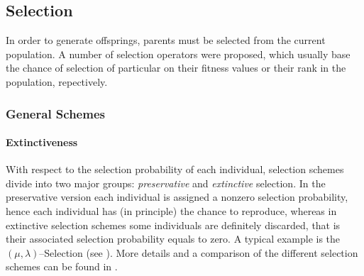 %
%

        \subsection{Selection}

In order to generate offsprings, parents must be selected from the
current population.
A number of selection operators were proposed, which usually base the
chance of selection of particular on their fitness values or their
rank in the population, repectively.

        \subsubsection{General Schemes}





        \paragraph{Extinctiveness}

With respect to the selection probability of each individual,
selection schemes divide into two major groups:
\emph{preservative} and
\emph{extinctive} selection. In the preservative
version each individual is assigned a nonzero selection probability,
hence each individual has (in principle) the chance to reproduce,
whereas in extinctive selection schemes some individuals are
definitely discarded, that is their associated selection probability
equals to zero.  A typical example is the $(\mu,\lambda)$--Selection
(see
).  More details and
a comparison of the different selection schemes can be found in
\cite{Baeck:91}.


